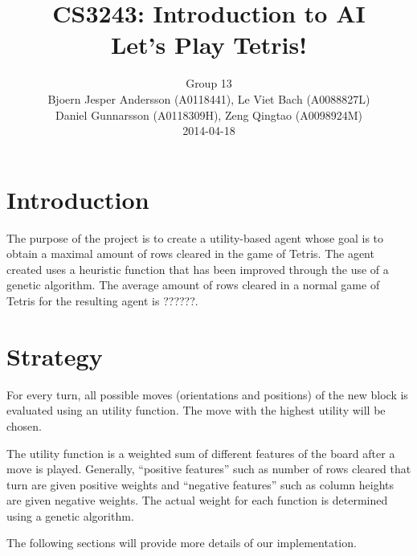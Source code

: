 \documentclass[twocolumn,12pt,journal]{IEEEtran_modified}
\begin{document}
\title{CS3243: Introduction to AI\\ Let’s Play Tetris! }

\author{
  Group 13 \\
  Bjoern Jesper Andersson (A0118441), Le Viet Bach (A0088827L) \\ Daniel Gunnarsson (A0118309H), Zeng Qingtao (A0098924M) \\
  2014-04-18 \\ 
}

\maketitle

\section{Introduction} 
The purpose of the project is to create a utility-based agent whose goal is to obtain a maximal amount of rows cleared in the game of Tetris. The agent created uses a heuristic function that has been improved through the use of a genetic algorithm. The average amount of rows cleared in a normal game of Tetris for the resulting agent is ??????.

\section{Strategy} 
For every turn, all possible moves (orientations and positions) of the new block is evaluated using an utility function. The move with the highest utility will be chosen.

The utility function is a weighted sum of different features of the board after a move is played. Generally, “positive features” such as number of rows cleared that turn are given positive weights and “negative features” such as column heights are given negative weights. The actual weight for each function is determined using a genetic algorithm.

The following sections will provide more details of our implementation.
\end{document}
